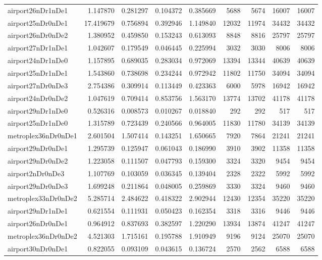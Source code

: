 \begin{longtable}{|l|r|r|r|r|r|r|r|r|}
airport26nDr1nDe1 & 1.147870 & 0.281297 & 0.104372 & 0.385669 & 5688 & 5674 & 16007 & 16007 \\
airport25nDr0nDe1 & 17.419679 & 0.756894 & 0.392946 & 1.149840 & 12032 & 11974 & 34432 & 34432 \\
airport26nDr0nDe2 & 1.380952 & 0.459850 & 0.153243 & 0.613093 & 8848 & 8816 & 25797 & 25797 \\
airport27nDr1nDe1 & 1.042607 & 0.179549 & 0.046445 & 0.225994 & 3032 & 3030 & 8006 & 8006 \\
airport24nDr1nDe0 & 1.157895 & 0.689035 & 0.283034 & 0.972069 & 13394 & 13344 & 40639 & 40639 \\
airport25nDr1nDe1 & 1.543860 & 0.738698 & 0.234244 & 0.972942 & 11802 & 11750 & 34094 & 34094 \\
airport27nDr0nDe3 & 2.754386 & 0.309914 & 0.113449 & 0.423363 & 6000 & 5978 & 16942 & 16942 \\
airport24nDr0nDe2 & 1.047619 & 0.709414 & 0.853756 & 1.563170 & 13774 & 13702 & 41178 & 41178 \\
airport29nDr1nDe0 & 0.526316 & 0.008573 & 0.010267 & 0.018840 & 292 & 292 & 517 & 517 \\
airport25nDr1nDe0 & 1.315789 & 0.723439 & 0.240566 & 0.964005 & 11830 & 11780 & 34139 & 34139 \\
metroplex36nDr0nDe1 & 2.601504 & 1.507414 & 0.143251 & 1.650665 & 7920 & 7864 & 21241 & 21241 \\
airport29nDr0nDe1 & 1.295739 & 0.125947 & 0.061043 & 0.186990 & 3910 & 3902 & 11358 & 11358 \\
airport29nDr0nDe2 & 1.223058 & 0.111507 & 0.047793 & 0.159300 & 3324 & 3320 & 9454 & 9454 \\
airport2nDr0nDe3 & 1.107769 & 0.103059 & 0.036345 & 0.139404 & 2328 & 2322 & 5992 & 5992 \\
airport29nDr0nDe3 & 1.699248 & 0.211864 & 0.048005 & 0.259869 & 3330 & 3324 & 9460 & 9460 \\
metroplex33nDr0nDe2 & 5.285714 & 2.484622 & 0.418322 & 2.902944 & 12430 & 12354 & 35220 & 35220 \\
airport29nDr1nDe1 & 0.621554 & 0.111931 & 0.050423 & 0.162354 & 3318 & 3316 & 9446 & 9446 \\
airport26nDr0nDe1 & 0.964912 & 0.837693 & 0.382597 & 1.220290 & 13934 & 13874 & 41247 & 41247 \\
metroplex36nDr0nDe2 & 4.521303 & 1.715161 & 0.195788 & 1.910949 & 9196 & 9124 & 25070 & 25070 \\
airport30nDr0nDe1 & 0.822055 & 0.093109 & 0.043615 & 0.136724 & 2570 & 2562 & 6588 & 6588 \\

\end{longtable}

